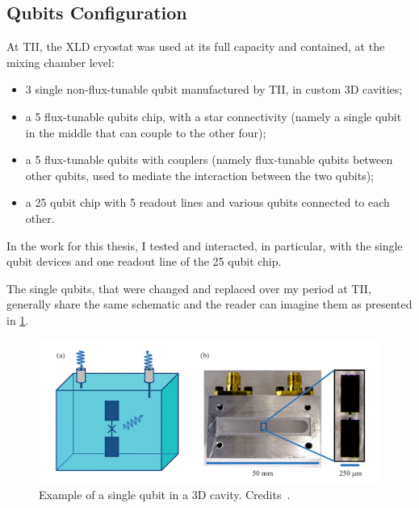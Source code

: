 


\subsection{Qubits Configuration}

At TII, the XLD cryostat was used at its full capacity and contained, at the mixing chamber level:
\begin{itemize}
    \item 3 single non-flux-tunable qubit manufactured by TII, in custom 3D cavities;
    \item a 5 flux-tunable qubits chip, with a star connectivity (namely a single qubit in the middle that can couple to the other four);
    \item a 5 flux-tunable qubits with couplers (namely flux-tunable qubits between other qubits, used to mediate the interaction between the two qubits);
    \item  a 25 qubit chip with 5 readout lines and various qubits connected to each other.
\end{itemize}

In the work for this thesis, I tested and interacted, in particular, with the single qubit devices and one readout line of the 25 qubit chip.

The single qubits, that were changed and replaced over my period at TII, generally share the same schematic and the reader can imagine them as presented in \cref{fig:single_qubit}.

\begin{figure}[ht]
    \centering
    \includegraphics[width=\textwidth]{Setup-software/figures/ex:transmon.png}
    \caption[Example of a single qubit in a 3D cavity]{Example of a single qubit in a 3D cavity. Credits~\cite{Huang2020}.}
    \label{fig:single_qubit}
\end{figure}

